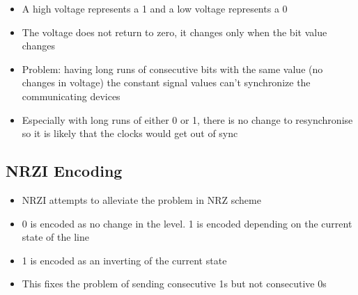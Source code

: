 \documentclass{article}[18pt]
\begin{document}
\begin{defin}
\begin{itemize}
	\item A high voltage represents a 1 and a low voltage represents a 0
	\item The voltage does not return to zero, it changes only when the bit value changes
\end{itemize}
\end{defin}




\begin{itemize}
	\item Problem: having long runs of consecutive bits with the same value (no changes in voltage) the constant signal values can't synchronize the communicating devices
	\item Especially with long runs of either 0 or 1, there is no change to resynchronise so it is likely that the clocks would get out of sync
\end{itemize}
\subsection{NRZI Encoding}
\begin{itemize}
	\item NRZI attempts to alleviate the problem in NRZ scheme
\end{itemize}
\begin{defin}
\begin{itemize}
	\item 0 is encoded as no change in the level. 1 is encoded depending on the current state of the line
	\item 1 is encoded as an inverting of the current state
\end{itemize}
\end{defin}


\begin{itemize}
	\item This fixes the problem of sending consecutive 1s but not consecutive 0s
\end{itemize}
\end{document}
